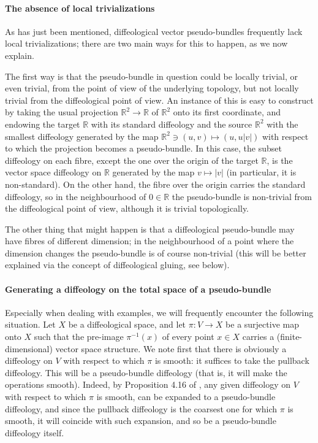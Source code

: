 \documentclass{article}
\newcommand\matR{{\mathbb{R}}}
\begin{document}
\paragraph{The absence of local trivializations} As has just been mentioned, diffeological vector pseudo-bundles frequently lack local trivializations; there are two main ways for this to happen, as we
now explain.

The first way is that the pseudo-bundle in question could be locally trivial, or even trivial, from the point of view of the underlying topology, but not locally trivial from the diffeological point of view. An instance 
of this is easy to construct by taking the usual projection $\matR^2\to\matR$ of $\matR^2$ onto its first coordinate, and endowing the target $\matR$ with its standard diffeology and the source $\matR^2$ with 
the smallest diffeology generated by the map $\matR^2\ni(u,v)\mapsto(u,u|v|)$ with respect to which the projection becomes a pseudo-bundle. In this case, the subset diffeology on each fibre, except the one 
over the origin of the target $\matR$, is the vector space diffeology on $\matR$ generated by the map $v\mapsto |v|$ (in particular, it is non-standard). On the other hand, the fibre over the origin carries 
the standard diffeology, so in the neighbourhood of $0\in\matR$ the pseudo-bundle is non-trivial from the diffeological point of view, although it is trivial topologically.

The other thing that might happen is that a diffeological pseudo-bundle may have fibres of different dimension; in the neighbourhood of a point where the dimension changes the pseudo-bundle is of course 
non-trivial (this will be better explained via the concept of diffeological gluing, see below).

\paragraph{Generating a diffeology on the total space of a pseudo-bundle} Especially when dealing with examples, we will frequently encounter the following situation. Let $X$ be a diffeological space, 
and let $\pi:V\to X$ be a surjective map onto $X$ such that the pre-image $\pi^{-1}(x)$ of every point $x\in X$ carries a (finite-dimensional) vector space structure. We note first that there is obviously a 
diffeology on $V$ with respect to which $\pi$ is smooth: it suffices to take the pullback diffeology. This will be a pseudo-bundle diffeology (that is, it will make the operations smooth). Indeed, by Proposition 
4.16 of \cite{CWtangent}, any given diffeology on $V$ with respect to which $\pi$ is smooth, can be expanded to a pseudo-bundle diffeology, and since the pullback diffeology is the coarsest one for which 
$\pi$ is smooth, it will coincide with such expansion, and so be a pseudo-bundle diffeology itself.
\end{document}
